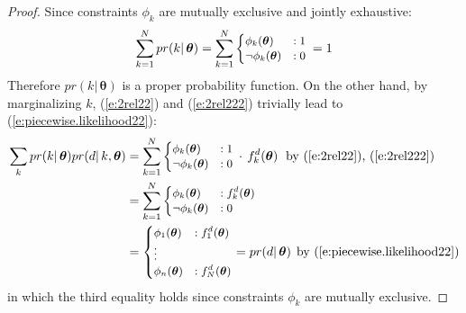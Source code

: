 \begin{proof}
Since constraints $\phi_k$ are mutually exclusive and jointly exhaustive: 
$$\sum_{k= 1}^N pr(k | \, \boldsymbol\theta) = 
\sum_{k=1}^N
{\footnotesize
\begin{cases}
\phi_k(\boldsymbol\theta)   &: 1\\
\neg \phi_k(\boldsymbol\theta)  &: 0
\end{cases}
}%
\, =1
$$
Therefore $pr(k | \, \boldsymbol\theta)$ is a proper probability function. 
On the other hand, by marginalizing $k$, (\ref{e:2rel22}) and (\ref{e:2rel222}) trivially lead to (\ref{e:piecewise.likelihood22}):
{\small 
\begin{align*}
\sum_{k} pr(k | \, \boldsymbol\theta)pr(d | \, k, \boldsymbol\theta) 
&= 
\sum_{k=1}^N  
{\footnotesize
\begin{cases}
\phi_k(\boldsymbol\theta)  &: 1\\
\neg \phi_k(\boldsymbol\theta) &: 0
\end{cases}
}%
\, \cdot \, f^d_k(\boldsymbol \theta)
&&\text{\hspace{-5mm}by (\ref{e:2rel22}), (\ref{e:2rel222})}
\\
&=
\sum_{k=1}^N 
{\footnotesize
\begin{cases}
		\phi_k(\boldsymbol\theta)  &: f^d_k(\boldsymbol\theta)\\
\neg 	\phi_k(\boldsymbol\theta)  &: 0
\end{cases}
}%
\nonumber \\
&= {\footnotesize
\begin{cases}
\phi_1(\boldsymbol\theta)  &: f^d_1(\boldsymbol\theta)\\
\vdots\\
\phi_n(\boldsymbol\theta)  &: f^d_N(\boldsymbol\theta)
\end{cases}
}%
= pr(d | \, \boldsymbol\theta) 
&&\text{\hspace{-2mm}by (\ref{e:piecewise.likelihood22})}
\end{align*}}
in which the third equality holds since constraints $\phi_k$ are mutually exclusive. 
\end{proof}
 
